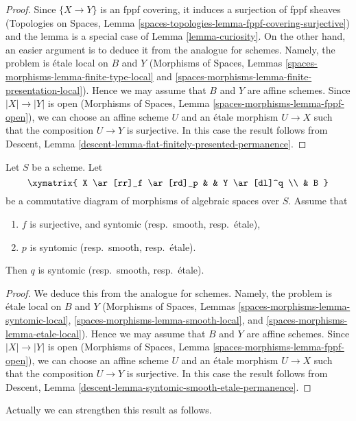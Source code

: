 \begin{proof}
Since $\{X \to Y\}$ is an fppf covering, it induces a surjection of
fppf sheaves (Topologies on Spaces, Lemma
\ref{spaces-topologies-lemma-fppf-covering-surjective}) and the
lemma is a special case of Lemma \ref{lemma-curiosity}.
On the other hand, an easier argument is to deduce it from
the analogue for schemes. Namely, the problem is \'etale local
on $B$ and $Y$ (Morphisms of Spaces, Lemmas
\ref{spaces-morphisms-lemma-finite-type-local} and
\ref{spaces-morphisms-lemma-finite-presentation-local}).
Hence we may assume that $B$ and $Y$ are affine
schemes. Since $|X| \to |Y|$ is open
(Morphisms of Spaces, Lemma \ref{spaces-morphisms-lemma-fppf-open}),
we can choose an affine
scheme $U$ and an \'etale morphism $U \to X$ such that the
composition $U \to Y$ is surjective. In this case the result
follows from Descent, Lemma
\ref{descent-lemma-flat-finitely-presented-permanence}.
\end{proof}

\begin{lemma}
\label{lemma-syntomic-smooth-etale-permanence}
Let $S$ be a scheme. Let
$$
\xymatrix{
X \ar[rr]_f \ar[rd]_p & &
Y \ar[dl]^q \\
& B
}
$$
be a commutative diagram of morphisms of algebraic spaces over $S$.
Assume that
\begin{enumerate}
\item $f$ is surjective, and syntomic (resp.\ smooth, resp.\ \'etale),
\item $p$ is syntomic (resp.\ smooth, resp.\ \'etale).
\end{enumerate}
Then $q$ is syntomic (resp.\ smooth, resp.\ \'etale).
\end{lemma}

\begin{proof}
We deduce this from the analogue for schemes.
Namely, the problem is \'etale local on $B$ and $Y$
(Morphisms of Spaces, Lemmas
\ref{spaces-morphisms-lemma-syntomic-local},
\ref{spaces-morphisms-lemma-smooth-local}, and
\ref{spaces-morphisms-lemma-etale-local}).
Hence we may assume that $B$ and $Y$ are affine
schemes. Since $|X| \to |Y|$ is open
(Morphisms of Spaces, Lemma \ref{spaces-morphisms-lemma-fppf-open}),
we can choose an affine
scheme $U$ and an \'etale morphism $U \to X$ such that the
composition $U \to Y$ is surjective. In this case the result
follows from Descent, Lemma
\ref{descent-lemma-syntomic-smooth-etale-permanence}.
\end{proof}

\noindent
Actually we can strengthen this result as follows.

